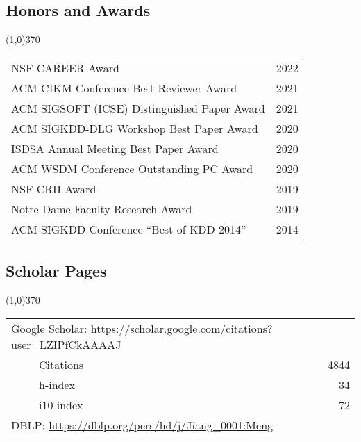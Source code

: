 \documentclass[10pt]{article}
\begin{document}
\vspace{-0.6cm}
\subsection{\sc Honors and Awards}
\vspace{-0.4cm} \line(1,0){370} \vspace{-0.1cm}

\begin{table}[h!]
\begin{tabular*}{12.7cm}{p{11.65cm}r}
NSF CAREER Award & 2022 \\
ACM CIKM Conference Best Reviewer Award & 2021 \\	
ACM SIGSOFT (ICSE) Distinguished Paper Award & 2021 \\
ACM SIGKDD-DLG Workshop Best Paper Award & 2020 \\
ISDSA Annual Meeting Best Paper Award & 2020 \\
ACM WSDM Conference Outstanding PC Award & 2020 \\
NSF CRII Award & 2019 \\
Notre Dame Faculty Research Award & 2019 \\
ACM SIGKDD Conference ``Best of KDD 2014'' & 2014 \\
\end{tabular*}
\end{table}

\vspace{-0.6cm}
\subsection{\sc Scholar Pages}
\vspace{-0.4cm} \line(1,0){370} \vspace{-0.1cm}

\begin{table}[h!]
\begin{tabular*}{12.7cm}{p{11.65cm}r}
\multicolumn{2}{l}{Google Scholar: \url{https://scholar.google.com/citations?user=LZIPfCkAAAAJ}} \\
~~~~~Citations & 4844 \\
~~~~~h-index & 34 \\
~~~~~i10-index & 72 \\
\multicolumn{2}{l}{DBLP: \url{https://dblp.org/pers/hd/j/Jiang\_0001:Meng}} \\
\end{tabular*}
\end{table}
\end{document}
